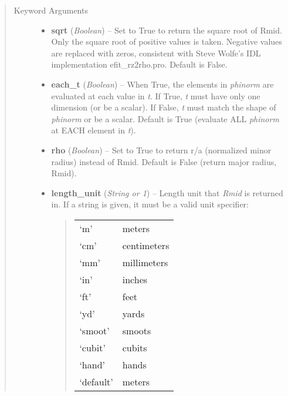 \documentclass[letterpaper,10pt,english]{sphinxmanual}
\begin{document}
\begin{fulllineitems}
\begin{fulllineitems}
\begin{quote}
\begin{description}
\begin{itemize}
\end{itemize}

\item[{Keyword Arguments}] \leavevmode\begin{itemize}
\item {} 
\textbf{sqrt} (\emph{Boolean}) --
Set to True to return the square root of Rmid.
Only the square root of positive values is taken. Negative
values are replaced with zeros, consistent with Steve Wolfe's
IDL implementation efit\_rz2rho.pro. Default is False.

\item {} 
\textbf{each\_t} (\emph{Boolean}) --
When True, the elements in \emph{phinorm} are evaluated
at each value in \emph{t}. If True, \emph{t} must have only one dimension
(or be a scalar). If False, \emph{t} must match the shape of \emph{phinorm}
or be a scalar. Default is True (evaluate ALL \emph{phinorm} at EACH
element in \emph{t}).

\item {} 
\textbf{rho} (\emph{Boolean}) --
Set to True to return r/a (normalized minor radius)
instead of Rmid. Default is False (return major radius, Rmid).

\item {} 
\textbf{length\_unit} (\emph{String or 1}) --
Length unit that \emph{Rmid} is returned in.
If a string is given, it must be a valid unit specifier:
\begin{quote}

\begin{tabulary}{\linewidth}{|L|L|}
\hline

`m'
 & 
meters
\\

`cm'
 & 
centimeters
\\

`mm'
 & 
millimeters
\\

`in'
 & 
inches
\\

`ft'
 & 
feet
\\

`yd'
 & 
yards
\\

`smoot'
 & 
smoots
\\

`cubit'
 & 
cubits
\\

`hand'
 & 
hands
\\

`default'
 & 
meters
\\
\hline\end{tabulary}


\end{quote}
\end{itemize}
\end{description}
\end{quote}
\end{fulllineitems}
\end{fulllineitems}
\end{document}
